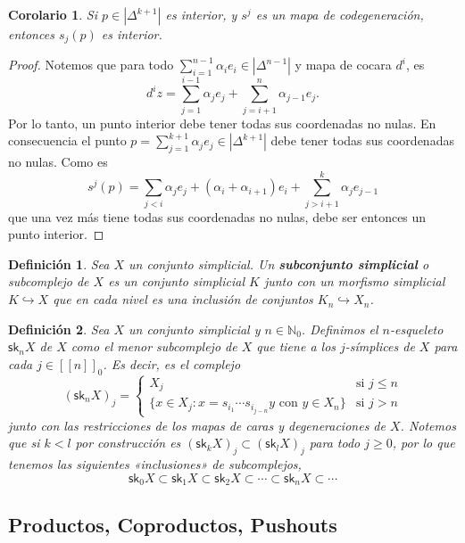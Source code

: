 \documentclass[11pt]{report}
\theoremstyle{colored}
\newtheorem{definition}{Definición}[section]
\newtheorem{corollary}{Corolario}[section]
\newcommand{\N}{\mathbb{N}}
\newcommand{\nat}[1]{[\![#1]\!]}
\newcommand{\natzero}[1]{\nat{#1}_0}
\newcommand{\sk}{\mathsf{sk}}
\renewcommand{\ss}[1]{\Delta^{#1}}
\newcommand{\guill}[1]{«#1»}
\begin{document}
\begin{corollary} Si $p \in |\ss{k+1}|$ es interior, y $s^j$ es un mapa de codegeneración, entonces $s_j(p)$ es interior. 
\end{corollary}
\begin{proof} Notemos que para todo $\sum_{i=1}^{n-1}\alpha_ ie_i \in |\ss{n-1}|$ y mapa de cocara $d^i$, es 
\[
d^iz= \sum_{j=1}^{i-1}\alpha_j e_j + \sum_{j = i+1}^{n}\alpha_{j-1} e_j.
\]
Por lo tanto, un punto interior debe tener todas sus coordenadas no nulas. En consecuencia el punto $p = \sum_{j=1}^{k+1}\alpha_je_j \in |\ss{k+1}|$ debe tener todas sus coordenadas no nulas. Como es
\[
s^j(p) = \sum_{j < i}\alpha_j e_j + (\alpha_i+\alpha_{i+1})e_i + \sum_{j > i+1}^k \alpha_{j}e_{j-1}
\]
que una vez más tiene todas sus coordenadas no nulas, debe ser entonces un punto interior.
\end{proof}

\begin{definition} Sea $X$ un conjunto simplicial. Un \textbf{subconjunto simplicial} o subcomplejo de $X$ es un conjunto simplicial $K$ junto con un morfismo simplicial $K \hookrightarrow X$ que en cada nivel es una inclusión de conjuntos $K_n \hookrightarrow X_n$.
\end{definition}

\begin{definition} Sea $X$ un conjunto simplicial y $n \in \N_0$. Definimos el $n$-esqueleto $\sk_n X$ de $X$ como el menor subcomplejo de $X$ que tiene a los $j$-símplices de $X$ para cada $j \in \natzero{n}$. Es decir, es el complejo
\[
(\sk_nX)_j = \begin{cases}
X_j &\text{si $j \leq n$}\\
\{x \in X_j : x = s_{i_1} \cdots s_{i_{j-n}}y \text{ con } y \in X_n\} &\text{si $j > n$}
\end{cases}
\]
junto con las restricciones de los mapas de caras y degeneraciones de $X$. Notemos que si $k < l$ por construcción es $(\sk_k X)_j \subset (\sk_l X)_j$ para todo $j \geq 0$, por lo que tenemos las siguientes \guill{inclusiones} de subcomplejos,
\[
\sk_0X \subset \sk_1X \subset \sk_2X \subset \cdots \subset \sk_nX \subset \cdots
\]
\todo{Probar que $X \simeq \operatorname{colim} \sk_nX$}
\end{definition}

\subsection{Productos, Coproductos, Pushouts}
\end{document}
